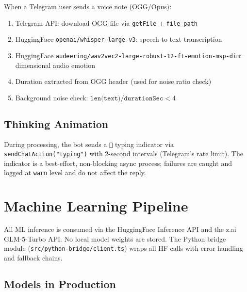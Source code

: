 \documentclass[12pt,a4paper]{article}
\begin{document}
When a Telegram user sends a voice note (OGG/Opus):

\begin{enumerate}[noitemsep]
  \item Telegram API: download OGG file via \texttt{getFile} + \texttt{file\_path}
  \item HuggingFace \texttt{openai/whisper-large-v3}: speech-to-text transcription
  \item HuggingFace \texttt{audeering/wav2vec2-large-robust-12-ft-emotion-msp-dim}: dimensional audio emotion
  \item Duration extracted from OGG header (used for noise ratio check)
  \item Background noise check: $\texttt{len(text)} / \texttt{durationSec} < 4$
\end{enumerate}

\subsection{Thinking Animation}

During processing, the bot sends a \texttt{💭} typing indicator via
\texttt{sendChatAction("typing")} with 2-second intervals (Telegram's
rate limit). The indicator is a best-effort, non-blocking async process;
failures are caught and logged at \texttt{warn} level and do not affect the reply.

\section{Machine Learning Pipeline}
\label{sec:ml}

All ML inference is consumed via the HuggingFace Inference API and the z.ai
GLM-5-Turbo API. No local model weights are stored. The Python bridge module
(\texttt{src/python-bridge/client.ts}) wraps all HF calls with error handling
and fallback chains.

\subsection{Models in Production}
\end{document}
